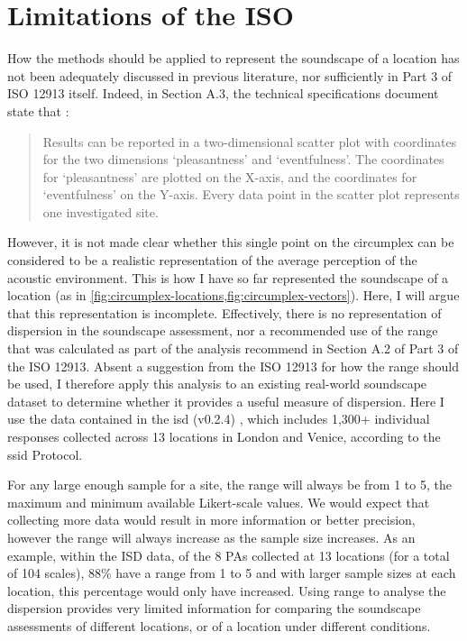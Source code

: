 \section{Limitations of the ISO}
How the \citet{ISO12913Part3} methods should be applied to represent the soundscape of a location has not been adequately discussed in previous literature, nor sufficiently in Part 3 of ISO 12913 itself. Indeed, in Section A.3, the technical specifications document state that \citep[p. 5]{ISO12913Part3}:

\begin{quote}
  Results can be reported in a two-dimensional scatter plot with coordinates for the two dimensions ‘pleasantness’ and ‘eventfulness’. The coordinates for ‘pleasantness’ are plotted on the X-axis, and the coordinates for ‘eventfulness’ on the Y-axis. Every data point in the scatter plot represents one investigated site.
\end{quote}

However, it is not made clear whether this single point on the circumplex can be considered to be a realistic representation of the average perception of the acoustic environment. This is how I have so far represented the soundscape of a location (as in \cref{fig:circumplex-locations,fig:circumplex-vectors}). Here, I will argue that this representation is incomplete. Effectively, there is no representation of dispersion in the soundscape assessment, nor a recommended use of the range that was calculated as part of the analysis recommend in Section A.2 of Part 3 of the ISO 12913. Absent a suggestion from the ISO 12913 for how the range should be used, I therefore apply this analysis to an existing real-world soundscape dataset to determine whether it provides a useful measure of dispersion. Here I use the data contained in the \gls{isd} (v0.2.4) \citep{Mitchell2021International}, which includes 1,300+ individual responses collected across 13 locations in London and Venice, according to the \gls{ssid} Protocol.

For any large enough sample for a site, the range will always be from 1 to 5, the maximum and minimum available Likert-scale values. We would expect that collecting more data would result in more information or better precision, however the range will always increase as the sample size increases. As an example, within the ISD data, of the 8 PAs collected at 13 locations (for a total of 104 scales), 88\% have a range from 1 to 5 and with larger sample sizes at each location, this percentage would only have increased. Using range to analyse the dispersion provides very limited information for comparing the soundscape assessments of different locations, or of a location under different conditions.

